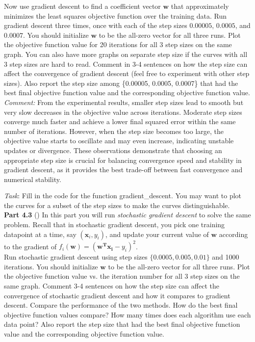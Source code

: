   Now use gradient descent to find a coefficient vector $\textbf{w}$ that 
approximately minimizes the
  least squares objective function over the training data. Run gradient descent
  three times, once with each of the step sizes
  $0.00005$, $0.0005$, and $0.0007$. You should initialize $\textbf{w}$ to be
  the all-zero vector for all three runs. Plot the objective function
  value for 20 iterations for all 3 step sizes on the same
  graph. You can also have more graphs on separate step size if the curves with all 3 step sizes are hard to read. Comment in 3-4 sentences on how the step size can affect the
  convergence of gradient descent (feel free to experiment with other
  step sizes). Also report the step size among \{0.00005, 0.0005, 0.0007\} that had the best final
  objective function value and the corresponding objective function value.\\

\textit{Comment:} From the experimental results, smaller step sizes lead to smooth but very slow decreases in the objective value across iterations. 
Moderate step sizes converge much faster and achieve a lower final squared error within the same number of iterations. 
However, when the step size becomes too large, the objective value starts to oscillate and may even increase, indicating unstable updates or divergence. 
These observations demonstrate that choosing an appropriate step size is crucial for balancing convergence speed and stability in gradient descent, as it provides the best trade-off between fast convergence and numerical stability.

\bigskip
  \noindent \emph{Task}: Fill in the code for the function \colorbox{Gainsboro!60!Lavender}{gradient\_descent}. You may want to plot the curves for a subset of the step sizes to make the curves distinguishable. \\

\textbf{Part 4.3} ()
In this part you will run \emph{stochastic gradient descent} to solve the same problem.  Recall that in stochastic gradient descent, you pick one training datapoint at a time, say $(\textbf{x}_i,y_i)$, and update your current value of $\textbf{w}$ according to the gradient of $f_i(\mathbf{w})=(\mathbf{w^T x_i}-y_i)^2$. \\

Run stochastic gradient descent using step sizes
$\{0.0005, 0.005, 0.01\}$ and 1000 iterations. You should initialize $\mathbf{w}$ to be the all-zero vector for all three runs. Plot the objective
function value vs. the iteration number for all 3 step sizes on the
same graph. Comment 3-4 sentences on how the step size can affect the
convergence of stochastic gradient descent and how it compares to
gradient descent. Compare the performance of the two methods. How do
the best final objective function values compare? How many times does
each algorithm use each data point? Also report the step size that had
the best final objective function value and the
corresponding objective function value.\\

